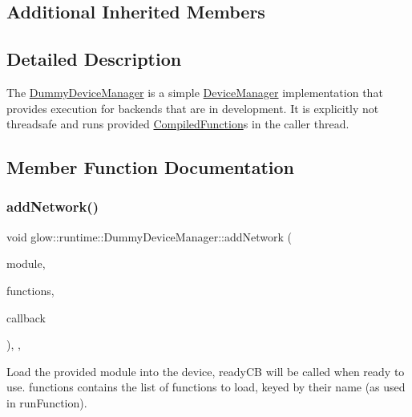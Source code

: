 \subsection*{Additional Inherited Members}


\subsection{Detailed Description}
The \hyperlink{classglow_1_1runtime_1_1_dummy_device_manager}{Dummy\+Device\+Manager} is a simple \hyperlink{classglow_1_1runtime_1_1_device_manager}{Device\+Manager} implementation that provides execution for backends that are in development. It is explicitly not threadsafe and runs provided \hyperlink{classglow_1_1_compiled_function}{Compiled\+Function}\textquotesingle{}s in the caller thread. 

\subsection{Member Function Documentation}
\mbox{\label{classglow_1_1runtime_1_1_dummy_device_manager_a73a826505a055281b9ad2902f6ffdb0f}} 
\subsubsection{\texorpdfstring{add\+Network()}{addNetwork()}}
{\footnotesize\ttfamily void glow\+::runtime\+::\+Dummy\+Device\+Manager\+::add\+Network (\begin{DoxyParamCaption}\item[{const \hyperlink{classglow_1_1_module}{Module} $\ast$}]{module,  }\item[{Function\+Map\+Ty}]{functions,  }\item[{Ready\+C\+B\+Ty}]{callback }\end{DoxyParamCaption})\hspace{0.3cm}{\ttfamily [inline]}, {\ttfamily [override]}, {\ttfamily [virtual]}}

Load the provided module into the device, ready\+CB will be called when ready to use. {\ttfamily functions} contains the list of functions to load, keyed by their name (as used in run\+Function). 

